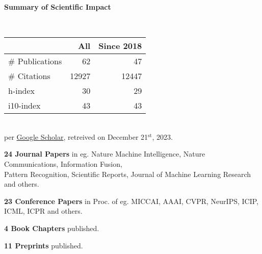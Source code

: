 \headedsection %
{\bf Summary of Scientific Impact}{}{}
{
    \qquad~~~~
    \begin{minipage}[t]{0.6\textwidth}
        \begin{tabular}{lrr}
        \hline
         & All & Since 2018\\
        \hline
        \# Publications & 62     & 47    \\
        \# Citations    & 12927  & 12447 \\
        h-index         & 30     & 29    \\
        i10-index       & 43     & 43    \\
        \hline
    \end{tabular}
    \\
    {\footnotesize{
        per \href{https://scholar.google.com/citations?user=wpLQuroAAAAJ}{Google Scholar},
        retreived on December 21$^\text{st}$, 2023.
        }
    }
    \end{minipage}

    \ifdefined\shortcv
        \vstep
        {\bf 24 Journal Papers} in eg. Nature Machine Intelligence, Nature Communications, Information Fusion,\\
        \hspace*{\fill} Pattern Recognition, Scientific Reports, Journal of Machine Learning Research and others.

        {\bf 23 Conference Papers} in Proc. of eg. MICCAI, AAAI, CVPR, NeurIPS, ICIP, ICML, ICPR and others.

        {\bf 4 Book Chapters} published.

        {\bf 11 Preprints} published.
        
    \else
        {}
    \fi

}
